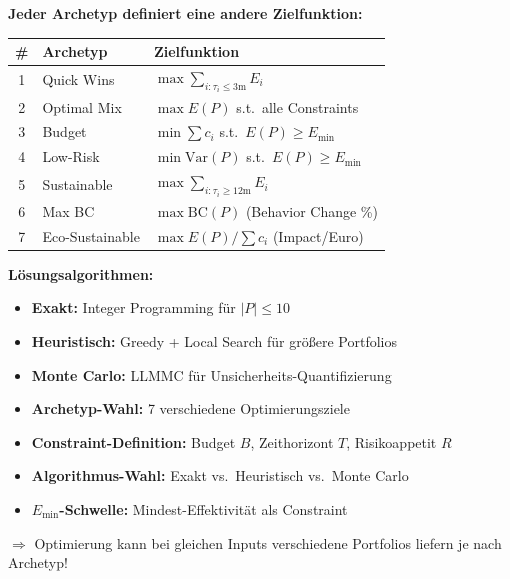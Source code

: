 \begin{tcolorbox}[colback=blue!5!white, colframe=blue!75!black,
    title=\textbf{Die 7 Portfolio-Archetypen als Optimierungsziele}]

\textbf{Jeder Archetyp definiert eine andere Zielfunktion:}

\begin{center}
\renewcommand{\arraystretch}{1.3}
\footnotesize
\begin{tabular}{@{}clp{5cm}@{}}
\toprule
\textbf{\#} & \textbf{Archetyp} & \textbf{Zielfunktion} \\
\midrule
1 & Quick Wins & $\max \sum_{i: \tau_i \leq 3\text{m}} E_i$ \\
2 & Optimal Mix & $\max E(P)$ s.t.\ alle Constraints \\
3 & Budget & $\min \sum c_i$ s.t.\ $E(P) \geq E_{\min}$ \\
4 & Low-Risk & $\min \text{Var}(P)$ s.t.\ $E(P) \geq E_{\min}$ \\
5 & Sustainable & $\max \sum_{i: \tau_i \geq 12\text{m}} E_i$ \\
6 & Max BC & $\max \text{BC}(P)$ (Behavior Change \%) \\
7 & Eco-Sustainable & $\max E(P)/\sum c_i$ (Impact/Euro) \\
\bottomrule
\end{tabular}
\end{center}

\end{tcolorbox}

\textbf{Lösungsalgorithmen:}
\begin{itemize}[nosep]
\item \textbf{Exakt:} Integer Programming für $|P| \leq 10$
\item \textbf{Heuristisch:} Greedy + Local Search für größere Portfolios
\item \textbf{Monte Carlo:} LLMMC für Unsicherheits-Quantifizierung
\end{itemize}

\begin{tcolorbox}[colback=orange!5!white, colframe=orange!75!black,
    title=\textbf{Variabilität in Phase 5b}]
\begin{itemize}[nosep]
\item \textbf{Archetyp-Wahl:} 7 verschiedene Optimierungsziele
\item \textbf{Constraint-Definition:} Budget $B$, Zeithorizont $T$, Risikoappetit $R$
\item \textbf{Algorithmus-Wahl:} Exakt vs.\ Heuristisch vs.\ Monte Carlo
\item \textbf{$E_{\min}$-Schwelle:} Mindest-Effektivität als Constraint
\end{itemize}
$\Rightarrow$ Optimierung kann bei gleichen Inputs verschiedene Portfolios liefern je nach Archetyp!
\end{tcolorbox}

